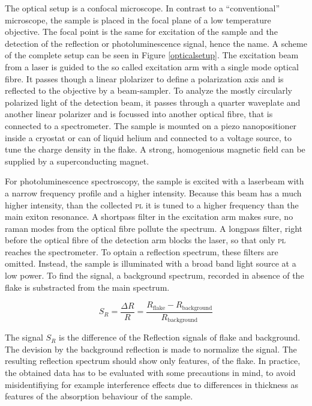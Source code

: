 The optical setup is a confocal microscope. In contrast to a ``conventional'' microscope, the sample is placed in the focal plane of a low temperature objective. The focal point is the same for excitation of the sample and the detection of the reflection or photoluminescence signal, hence the name. A scheme of the complete setup can be seen in Figure \ref{opticalsetup}. The excitation beam from a laser is guided to the so called excitation arm with a single mode optical fibre. It passes though a linear plolarizer to define a polarization axis and is reflected to the objective by a beam-sampler. To analyze the mostly circularly polarized light of the detection beam, it passes through a quarter waveplate and another linear polarizer and is focussed into another optical fibre, that is connected to a spectrometer. The sample is mounted on a piezo nanopositioner inside a cryostat or can of liquid helium and connected to a voltage source, to tune the charge density in the \tmdg flake. A strong, homogenious magnetic field can be supplied by a superconducting magnet.

For photoluminescence spectroscopy, the sample is excited with a laserbeam with a narrow frequency profile and a higher intensity. Because this beam has a much higher intensity, than the collected \textsc{pl} it is tuned to a higher frequency than the main exiton resonance. A shortpass filter in the excitation arm makes sure, no raman modes from the optical fibre pollute the spectrum. A longpass filter, right before the optical fibre of the detection arm blocks the laser, so that only \textsc{pl} reaches the spectrometer. To optain a reflection spectrum, these filters are omitted. Instead, the sample is illuminated with a broad band light source at a low power. To find the signal, a background spectrum, recorded in absence of the \tmdg flake is substracted from the main spectrum.

\[ 
	S_R = \frac{\Delta R}{R} = \frac{R_{\mathrm{flake}} - R_{\mathrm{background}}}{R_{\mathrm{background}}}
\]

The signal $S_R$ is the difference of the Reflection signals of \tmdg flake and background. The devision by the background reflection is made to normalize the signal. The resulting reflection spectrum should show only features, of the flake. In practice, the obtained data has to be evaluated with some precautions in mind, to avoid misidentifiying for example interference effects due to differences in \hbng thickness as features of the absorption behaviour of the sample.

